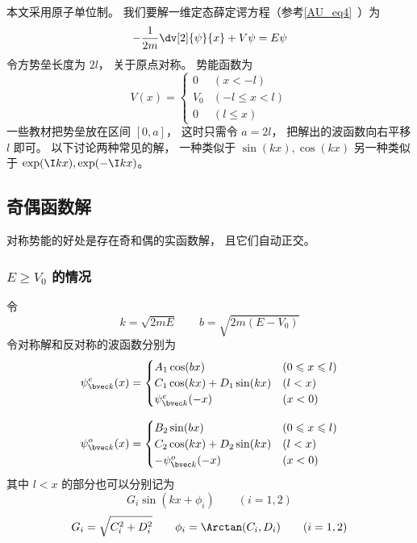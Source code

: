 


本文采用原子单位制。 我们要解一维定态薛定谔方程（参考\autoref{AU_eq4}~）为
\begin{equation}
-\frac{1}{2m} \dv[2]{\psi}{x} + V\psi= E \psi
\end{equation}
令方势垒长度为 $2l$， 关于原点对称。 势能函数为
\begin{equation}
V(x) =
\begin{cases}
0 & (x < -l)\\
V_0 & (-l \leqslant x < l)\\
0 & (l \leqslant x)
\end{cases}
\end{equation}
一些教材把势垒放在区间 $[0, a]$， 这时只需令 $a = 2l$， 把解出的波函数向右平移 $l$ 即可。 以下讨论两种常见的解， 一种类似于 $\sin(kx), \cos(kx)$ 另一种类似于 $\exp(\I kx), \exp(-\I kx)$。

\subsection{奇偶函数解}
对称势能的好处是存在奇和偶的实函数解， 且它们自动正交。
\subsubsection{$E \ge V_0$ 的情况}
令
\begin{equation}
k = \sqrt{2mE}
\qquad
b = \sqrt{2m(E-V_0)}
\end{equation}
令对称解和反对称的波函数分别为
\begin{equation}
\psi_{\bvec k}^e(x) =
\begin{cases}
A_1 \cos(bx) & (0 \leqslant x \leqslant l)\\
C_1 \cos(kx) + D_1 \sin(kx) & (l < x)\\
\psi_{\bvec k}^e(-x) & (x < 0)
\end{cases}
\end{equation}

\begin{equation}
\psi_{\bvec k}^o(x) =
\begin{cases}
B_2 \sin(bx) & (0 \leqslant x \leqslant l)\\
C_2 \cos(kx) + D_2 \sin(kx) & (l < x)\\
-\psi_{\bvec k}^o(-x) & (x < 0)
\end{cases}
\end{equation}
其中 $l < x$ 的部分也可以分别记为
\begin{equation}
G_i \sin(kx + \phi_i) \qquad (i = 1,2)
\end{equation}
\begin{equation}
G_i = \sqrt{C_i^2 + D_i^2}
\qquad
\phi_i = \Arctan(C_i, D_i)
\qquad
(i = 1,2)
\end{equation}


